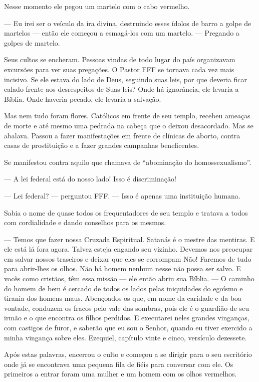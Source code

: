Nesse momento ele pegou um martelo com o cabo vermelho.

--- Eu irei ser o veículo da ira divina, destruindo esses ídolos de barro a golpe de martelos --- então ele começou a esmagá-los com um martelo. --- Pregando a golpes de martelo.

Seus cultos se encheram. Pessoas vindas de todo lugar do país organizavam excursões para ver suas pregações. O Pastor FFF se tornava cada vez mais incisivo. Se ele estava do lado de Deus, seguindo suas leis, por que deveria ficar calado frente aos desrespeitos de Suas leis? Onde há ignorância, ele levaria a Bíblia. Onde haveria pecado, ele levaria a salvação.

Mas nem tudo foram flores. Católicos  em frente de seu templo, recebeu ameaças de morte e até mesmo uma pedrada na cabeça que o deixou desacordado. Mas  se abalava. Passou a fazer manifestações em frente de clínicas de aborto, contra casas de prostituição e a fazer grandes campanhas beneficentes.

Se manifestou contra aquilo que chamava de ``abominação do homossexualismo''.

--- A lei federal está do nosso lado! Isso é discriminação!

--- Lei federal? --- perguntou FFF. --- Isso é apenas uma instituição humana.

Sabia o nome de quase todos os frequentadores de seu templo e tratava a todos com cordialidade e dando conselhos para os mesmos.

--- Temos que fazer nossa Cruzada Espiritual. Satanás é o mestre das mentiras. E ele está lá fora agora. Talvez esteja engando seu vizinho. Devemos nos preocupar em salvar nossos traseiros e deixar que eles se corrompam Não! Faremos de tudo para abrir-lhes os olhos. Não há homem nenhum nesse  não possa ser salvo. E vocês\mudanca{,} como cristãos, têm essa missão --- ele então abriu sua Bíblia. ---  O caminho do homem de bem é cercado de todos os lados pelas iniquidades do egoísmo e tirania dos homens maus. Abençoados os que, em nome da caridade e da boa vontade, conduzem os fracos pelo vale das sombras, pois ele é o guardião de seu irmão e o que encontra os filhos perdidos. E executarei neles grandes vinganças, com castigos de furor, e saberão que eu sou o Senhor, quando eu tiver exercido a minha vingança sobre eles. Ezequiel, capítulo vinte e cinco, versículo dezessete.

Após estas palavras, encerrou o culto e começou a se dirigir para o seu escritório\mudanca{,} onde já se encontrava uma pequena fila de fiéis para conversar com ele. Os primeiros a entrar foram uma mulher e um homem com os olhos vermelhos.

